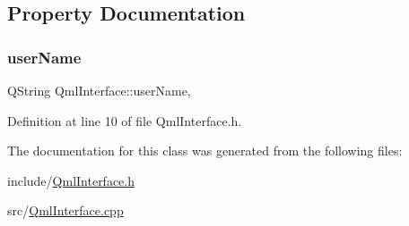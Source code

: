 \subsection{Property Documentation}
\mbox{\label{class_qml_interface_a3a24523a9f712669415a6719d423d665}} 
\subsubsection{\texorpdfstring{user\+Name}{userName}}
{\footnotesize\ttfamily Q\+String Qml\+Interface\+::user\+Name\hspace{0.3cm}{\ttfamily [read]}, {\ttfamily [write]}}



Definition at line 10 of file Qml\+Interface.\+h.



The documentation for this class was generated from the following files\+:\begin{DoxyCompactItemize}
\item 
include/\hyperlink{_qml_interface_8h}{Qml\+Interface.\+h}\item 
src/\hyperlink{_qml_interface_8cpp}{Qml\+Interface.\+cpp}\end{DoxyCompactItemize}
